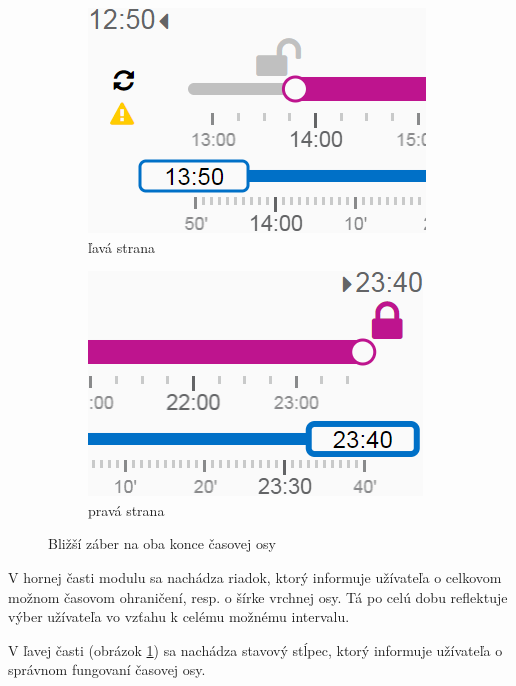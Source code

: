 \documentclass[
  printed, %
  twoside, %
  notable,   %
  nolof,   %
  nolot,   %
]{fithesis3}
\begin{document}
\begin{figure}
\centering
\begin{subfigure}{.5\textwidth}
  \centering
  \includegraphics[width=.9\linewidth]{slider_left_150}
  \caption{ľavá strana}
  \label{slider_detail_150_left}
\end{subfigure}%
\begin{subfigure}{.5\textwidth}
  \centering
  \includegraphics[width=.9\linewidth]{slider_right_150}
  \caption{pravá strana}
\end{subfigure}
\caption{Bližší záber na oba konce časovej osy}
\label{slider_detail_150}
\end{figure}

V hornej časti modulu sa nachádza riadok, ktorý informuje užívateľa o celkovom možnom časovom ohraničení, resp. o šírke vrchnej osy. Tá po celú dobu reflektuje výber užívateľa vo vzťahu k celému možnému intervalu.

V ľavej časti (obrázok \ref{slider_detail_150_left}) sa nachádza stavový stĺpec, ktorý informuje užívateľa o správnom fungovaní časovej osy.
\end{document}

